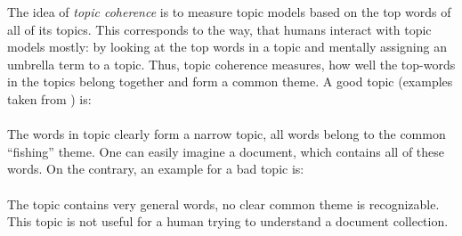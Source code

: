 \documentclass[
        a4paper,
        titlepage,
        twoside,
        parskip
        ]{scrbook}
\theoremstyle{break}
\begin{document}
The idea of \emph{topic coherence} is to measure topic models based on the top words of all of its topics.
This corresponds to the way, that humans interact with topic models mostly: by looking at the top words in a topic and mentally assigning an umbrella term to a topic.
Thus, topic coherence measures, how well the top-words in the topics belong together and form a common theme.
A good topic (examples taken from \cite{Boyd-graber2014}) is: \\
\hspace*{1cm}  \\
The words in topic clearly form a narrow topic, all words belong to the common ``fishing'' theme.
One can easily imagine a document, which contains all of these words.
On the contrary, an example for a bad topic is: \\
\hspace*{1cm}  \\
The topic contains very general words, no clear common theme is recognizable.
This topic is not useful for a human trying to understand a document collection.
\end{document}
